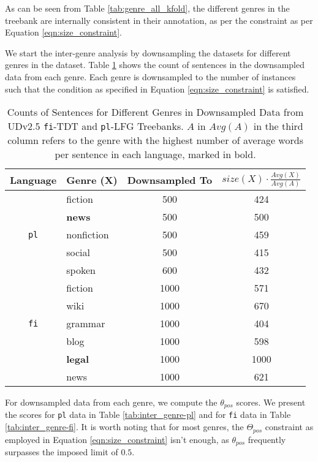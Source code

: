 As can be seen from Table \ref{tab:genre_all_kfold}, the different genres in the treebank are internally consistent in their annotation, as per the constraint as per Equation \ref{eqn:size_constraint}.

We start the inter-genre analysis by downsampling the datasets for different genres in the dataset. Table \ref{tab:downsample_genre} shows the count of sentences in the downsampled data from each genre. Each genre is downsampled to the number of instances such that the condition as specified in Equation \ref{eqn:size_constraint} is satisfied.

\begin{table}[H]
    \centering
    \begin{tabular}{|c|l|c|c|}
        \hline
        \textbf{Language} & \textbf{Genre (X)} & \textbf{Downsampled To} & \textbf{$size(X) \cdot \frac{Avg(X)}{Avg(A)}$}\\
         \hline
         & fiction & 500 & 424 \\
         & \textbf{news} & 500 & 500 \\
        \texttt{pl} & nonfiction & 500 & 459 \\
         & social & 500 & 415 \\
         & spoken & 600 & 432 \\
        \hline
         & fiction & 1000 & 571 \\
         & wiki & 1000 & 670 \\
        \texttt{fi} & grammar & 1000 & 404 \\
         & blog & 1000 & 598 \\
         & \textbf{legal} & 1000 & 1000 \\
         & news & 1000 & 621 \\
        \hline
    \end{tabular}
    \caption[Counts of Sentences for Different Genres in Downsampled Data from UDv2.5 \texttt{fi}-TDT and \texttt{pl}-LFG Treebanks]{Counts of Sentences for Different Genres in Downsampled Data from UDv2.5 \texttt{fi}-TDT and \texttt{pl}-LFG Treebanks. $A$ in $Avg(A)$ in the third column refers to the genre with the highest number of average words per sentence in each language, marked in bold.}
    \label{tab:downsample_genre}
\end{table}

For downsampled data from each genre, we compute the $\theta_{pos}$ scores. We present the scores for \texttt{pl} data in Table \ref{tab:inter_genre-pl} and for \texttt{fi} data in Table \ref{tab:inter_genre-fi}. It is worth noting that for most genres, the $\Theta_{pos}$ constraint as employed in Equation \ref{eqn:size_constraint} isn't enough, as $\theta_{pos}$ frequently surpasses the imposed limit of $0.5$.

